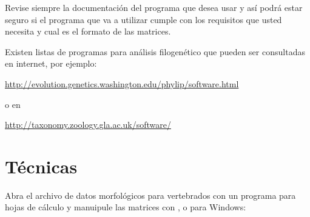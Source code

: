 Revise siempre la documentaci\'on del programa que desea usar y as\'i podr\'a estar seguro si el programa que va a utilizar cumple con los requisitos que usted necesita y cual es el formato de las matrices.

Existen listas de programas para an\'alisis filogen\'etico que pueden ser consultadas en internet, por ejemplo:


\url{http://evolution.genetics.washington.edu/phylip/software.html}
 
o en 

\url{http://taxonomy.zoology.gla.ac.uk/software/}

\section*{T\'ecnicas}

Abra el archivo de datos morfol\'ogicos para vertebrados  con un programa para hojas de c\'alculo y manuipule las matrices con ,  o  para Windows:

